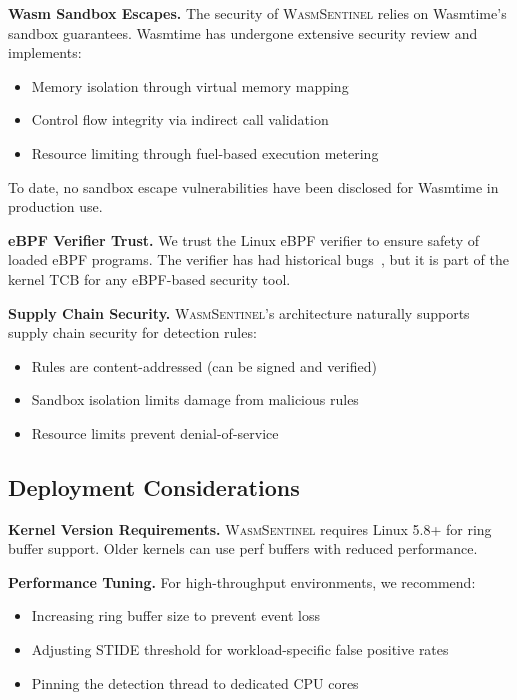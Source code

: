 \textbf{Wasm Sandbox Escapes.}
The security of \textsc{WasmSentinel} relies on Wasmtime's sandbox guarantees.
Wasmtime has undergone extensive security review and implements:
\begin{itemize}
    \item Memory isolation through virtual memory mapping
    \item Control flow integrity via indirect call validation
    \item Resource limiting through fuel-based execution metering
\end{itemize}

To date, no sandbox escape vulnerabilities have been disclosed for Wasmtime in production use.

\textbf{eBPF Verifier Trust.}
We trust the Linux eBPF verifier to ensure safety of loaded eBPF programs.
The verifier has had historical bugs~\cite{ebpf-bugs}, but it is part of the kernel TCB for any eBPF-based security tool.

\textbf{Supply Chain Security.}
\textsc{WasmSentinel}'s architecture naturally supports supply chain security for detection rules:
\begin{itemize}
    \item Rules are content-addressed (can be signed and verified)
    \item Sandbox isolation limits damage from malicious rules
    \item Resource limits prevent denial-of-service
\end{itemize}

\subsection{Deployment Considerations}

\textbf{Kernel Version Requirements.}
\textsc{WasmSentinel} requires Linux 5.8+ for ring buffer support.
Older kernels can use perf buffers with reduced performance.

\textbf{Performance Tuning.}
For high-throughput environments, we recommend:
\begin{itemize}
    \item Increasing ring buffer size to prevent event loss
    \item Adjusting STIDE threshold for workload-specific false positive rates
    \item Pinning the detection thread to dedicated CPU cores
\end{itemize}

